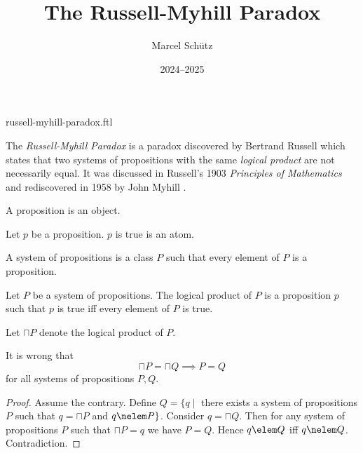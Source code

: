 \documentclass{article}
\title{The Russell-Myhill Paradox}
\author{Marcel Schütz}
\date{2024--2025}
\begin{document}
\begin{smodule}{russell-myhill-paradox.ftl}
\maketitle


\noindent The \emph{Russell-Myhill Paradox} is a paradox discovered by 
Bertrand Russell which states that two systems of propositions with the same 
\emph{logical product} are not necessarily equal.
It was discussed in Russell's 1903 \emph{Principles of Mathematics}
\cite[Appendix B]{Russell1903} and rediscovered in 1958 by John Myhill
\cite{Myhill1958}.

\begin{forthel}
  \begin{signature*}
    A proposition is an object.
  \end{signature*}

  \begin{signature*}
    Let $p$ be a proposition.
    $p$ is true is an atom.
  \end{signature*}

  \begin{definition*}
    A system of propositions is a class $P$ such that every element of $P$ is a proposition.
  \end{definition*}

  \begin{signature*}
    Let $P$ be a system of propositions.
    The logical product of $P$ is a proposition $p$ such that $p$ is true iff every element of $P$ is true.
  \end{signature*}
  
  Let $\sqcap P$ denote the logical product of $P$.
  
  \begin{theorem*}[title=Russell-Myhill Paradox,id=russell_myhill_paradox]
    It is wrong that
    \[ \sqcap P = \sqcap Q \implies P = Q \]
    for all systems of propositions $P, Q$.
  \end{theorem*}
  \begin{proof}
    Assume the contrary.
    Define $Q = \{q \mid$ there exists a system of propositions $P$ such that $q = \sqcap P$ and $q \nelem P\}$.
    Consider $q = \sqcap Q$.
    Then for any system of propositions $P$ such that $\sqcap P = q$ we have $P = Q$.
    Hence $q \elem Q$ iff $q \nelem Q$.
    Contradiction.
  \end{proof}
\end{forthel}

\printbibliography
{}
\end{smodule}
\end{document}
